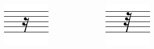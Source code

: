 \documentclass{beamer}
\begin{document}
\begin{frame}
\begin{columns}
\begin{column}{0.33\textwidth}
\begin{figure}[h!]
				\end{figure}
			\end{column}
			\begin{column}{0.33\textwidth}
				\centering
				\noindent
				\begin{figure}[h!]
					\includegraphics[width=0.7\columnwidth]{res/pdf/4/rest/sixteenth.pdf}
				\end{figure}
			\end{column}
			\begin{column}{0.33\textwidth}
				\centering
				\noindent
				\begin{figure}[h!]
					\includegraphics[width=0.7\columnwidth]{res/pdf/4/rest/thirty-second.pdf}
				\end{figure}
			\end{column}
		\end{columns}
		\vskip -1pc
		\begin{columns}
			\begin{column}{0.33\textwidth}

\end{column}
\end{columns}
\end{frame}
\end{document}

